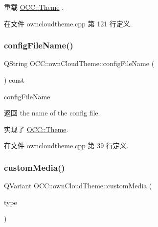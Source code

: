 重载 \hyperlink{class_o_c_c_1_1_theme_a65e92dc2b2dff6e39fe2e0362dbe6327}{O\+C\+C\+::\+Theme} .



在文件 owncloudtheme.\+cpp 第 121 行定义.

\mbox{\label{class_o_c_c_1_1own_cloud_theme_a83b4d95d9bc4fa972ad2e044720beac0}} 
\subsubsection{\texorpdfstring{config\+File\+Name()}{configFileName()}}
{\footnotesize\ttfamily Q\+String O\+C\+C\+::own\+Cloud\+Theme\+::config\+File\+Name (\begin{DoxyParamCaption}{ }\end{DoxyParamCaption}) const\hspace{0.3cm}{\ttfamily [virtual]}}



config\+File\+Name 

\begin{DoxyReturn}{返回}
the name of the config file. 
\end{DoxyReturn}


实现了 \hyperlink{class_o_c_c_1_1_theme_a998943bafbde46e6eb606876d06a003c}{O\+C\+C\+::\+Theme}.



在文件 owncloudtheme.\+cpp 第 39 行定义.

\mbox{\label{class_o_c_c_1_1own_cloud_theme_aa920f64294310b68e6ea50e1c2ec0d0b}} 
\subsubsection{\texorpdfstring{custom\+Media()}{customMedia()}}
{\footnotesize\ttfamily Q\+Variant O\+C\+C\+::own\+Cloud\+Theme\+::custom\+Media (\begin{DoxyParamCaption}\item[{\hyperlink{class_o_c_c_1_1_theme_a7d36668d1fd0d715e4e1d8f4590d2d5d}{Theme\+::\+Custom\+Media\+Type}}]{type }\end{DoxyParamCaption})\hspace{0.3cm}{\ttfamily [virtual]}}

